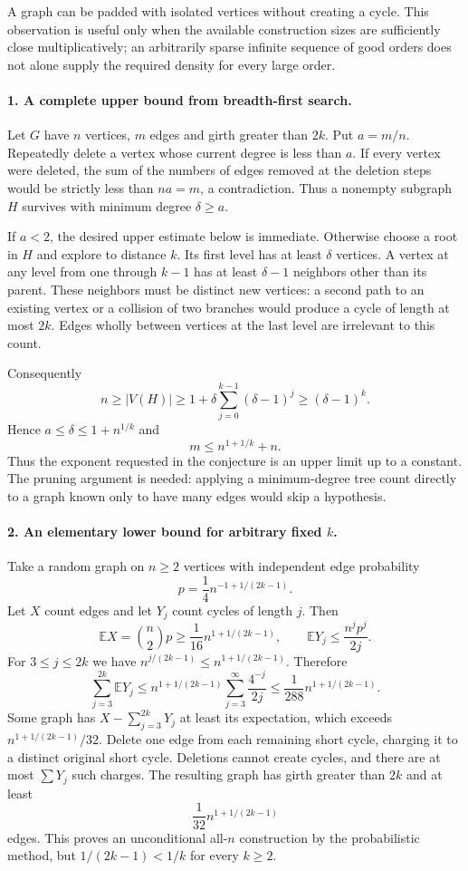 \documentclass[11pt]{article}
\begin{document}
A graph can be padded with isolated vertices without creating a cycle. This observation is useful only when the available construction sizes are sufficiently close multiplicatively; an arbitrarily sparse infinite sequence of good orders does not alone supply the required density for every large order.

\paragraph{1. A complete upper bound from breadth-first search.}
Let $G$ have $n$ vertices, $m$ edges and girth greater than $2k$. Put $a=m/n$. Repeatedly delete a vertex whose current degree is less than $a$. If every vertex were deleted, the sum of the numbers of edges removed at the deletion steps would be strictly less than $na=m$, a contradiction. Thus a nonempty subgraph $H$ survives with minimum degree $\delta\ge a$.

If $a<2$, the desired upper estimate below is immediate. Otherwise choose a root in $H$ and explore to distance $k$. Its first level has at least $\delta$ vertices. A vertex at any level from one through $k-1$ has at least $\delta-1$ neighbors other than its parent. These neighbors must be distinct new vertices: a second path to an existing vertex or a collision of two branches would produce a cycle of length at most $2k$. Edges wholly between vertices at the last level are irrelevant to this count.

Consequently
\[
 n\ge |V(H)|\ge1+\delta\sum_{j=0}^{k-1}(\delta-1)^j
 \ge(\delta-1)^k.
\]
Hence $a\le\delta\le1+n^{1/k}$ and
\[
 m\le n^{1+1/k}+n.
\]
Thus the exponent requested in the conjecture is an upper limit up to a constant. The pruning argument is needed: applying a minimum-degree tree count directly to a graph known only to have many edges would skip a hypothesis.

\paragraph{2. An elementary lower bound for arbitrary fixed $k$.}
Take a random graph on $n\ge2$ vertices with independent edge probability
\[
 p=\frac14 n^{-1+1/(2k-1)}.
\]
Let $X$ count edges and let $Y_j$ count cycles of length $j$. Then
\[
 \mathbb EX=\binom n2p\ge\frac1{16}n^{1+1/(2k-1)},
 \qquad
 \mathbb EY_j\le\frac{n^jp^j}{2j}.
\]
For $3\le j\le2k$ we have $n^{j/(2k-1)}\le n^{1+1/(2k-1)}$. Therefore
\[
 \sum_{j=3}^{2k}\mathbb EY_j
 \le n^{1+1/(2k-1)}\sum_{j=3}^{\infty}\frac{4^{-j}}{2j}
 \le\frac1{288}n^{1+1/(2k-1)}.
\]
Some graph has $X-\sum_{j=3}^{2k}Y_j$ at least its expectation, which exceeds $n^{1+1/(2k-1)}/32$. Delete one edge from each remaining short cycle, charging it to a distinct original short cycle. Deletions cannot create cycles, and there are at most $\sum Y_j$ such charges. The resulting graph has girth greater than $2k$ and at least
\[
 \frac1{32}n^{1+1/(2k-1)}
\]
edges. This proves an unconditional all-$n$ construction by the probabilistic method, but $1/(2k-1)<1/k$ for every $k\ge2$.
\end{document}
